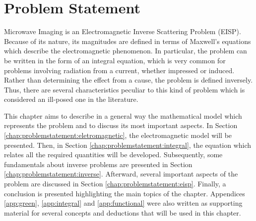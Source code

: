 
\chapter{Problem Statement}\label{chap:problemstatement}

	Microwave Imaging is an Electromagnetic Inverse Scattering Problem (EISP). Because of its nature, its magnitudes are defined in terms of Maxwell's equations which describe the electromagnetic phenomenon. In particular, the problem can be written in the form of an integral equation, which is very common for problems involving radiation from a current, whether impressed or induced. Rather than determining the effect from a cause, the problem is defined inversely. Thus, there are several characteristics peculiar to this kind of problem which is considered an ill-posed one in the literature.
	
	This chapter aims to describe in a general way the mathematical model which represents the problem and to discuss its most important aspects. In Section \ref{chap:problemstatement:eletromagnetic}, the electromagnetic model will be presented. Then, in Section \ref{chap:problemstatement:integral}, the equation which relates all the required quantities will be developed. Subsequently, some fundamentals about inverse problems are presented in Section \ref{chap:problemstatement:inverse}. Afterward, several important aspects of the problem are discussed in Section \ref{chap:problemstatement:eisp}. Finally, a conclusion is presented highlighting the main topics of the chapter. Appendices \ref{app:green}, \ref{app:integral} and \ref{app:functional} were also written as supporting material for several concepts and deductions that will be used in this chapter.

